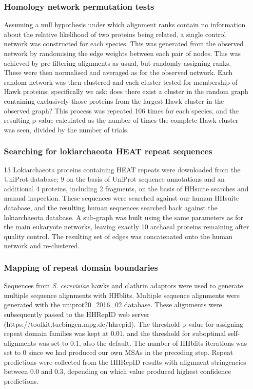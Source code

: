 \documentclass[a4paper,11pt,twoside,openright]{scrbook}
\begin{document}
\subsubsection{Homology network permutation tests}
Assuming a null hypothesis under which alignment ranks contain no information
about the relative likelihood of two proteins being related, a single control
network was constructed for each species. This was generated from the observed
network by randomising the edge weights between each pair of nodes. This was
achieved by pre-filtering alignments as usual, but randomly assigning ranks.
These were then normalised and averaged as for the observed network. Each random
network was then clustered and each cluster tested for membership of Hawk
proteins; specifically we ask: does there exist a cluster in the random graph
containing exclusively those proteins from the largest Hawk cluster in the
observed graph? This process was repeated 106 times for each species, and the
resulting p-value calculated as the number of times the complete Hawk cluster
was seen, divided by the number of trials.

\subsubsection{Searching for lokiarchaeota HEAT repeat sequences}
13 Lokiarchaeota proteins containing HEAT repeats were downloaded from the
UniProt database; 9 on the basis of UniProt sequence annotations and an
additional 4 proteins, including 2 fragments, on the basis of HHsuite searches
and manual inspection. These sequences were searched against our human HHsuite
database, and the resulting human sequences searched back against the
lokiarchaeota database. A sub-graph was built using the same parameters as for
the main eukaryote networks, leaving exactly 10 archaeal proteins remaining
after quality control. The resulting set of edges was concatenated onto the
human network and re-clustered.

\subsubsection{Mapping of repeat domain boundaries}
Sequences from \textit{S. cerevisiae} hawks and clathrin adaptors were used to
generate multiple sequence alignments with HHblits. Multiple sequence alignments
were generated with the uniprot20\_2016\_02 database. These alignments were
subsequently passed to the HHRepID web server \newline
(https://toolkit.tuebingen.mpg.de/hhrepid). The threshold p-value for assigning
repeat domain families was kept at 0.01, and the threshold for suboptimal
self-alignments was set to 0.1, also the default. The number of HHblits
iterations was set to 0 since we had produced our own MSAs in the preceding
step. Repeat predictions were collected from the HHRepID results with alignment
stringencies between 0.0 and 0.3, depending on which value produced highest
confidence predictions.
\end{document}
